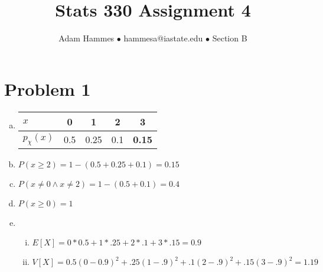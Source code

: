 \documentclass[11pt]{article}
\begin{document}
\title{Stats 330 Assignment 4}
\author{Adam Hammes $\bullet$ hammesa@iastate.edu $\bullet$ Section B}
\maketitle

\section*{Problem 1}
\begin{enumerate}[(a)]
	\item
	\begin{tabular}{l| c c c c|}
		$x$ & 0 & 1 & 2 & 3 \\
		\hline
		$p_{\chi}(x)$ & 0.5 & 0.25 & 0.1 & \textbf{0.15}\\
	\end{tabular}

	\item $P ( x \ge 2) = 1 - (0.5 + 0.25 + 0.1 ) = 0.15$
	
	\item $P ( x \neq 0 \wedge x \neq 2 ) = 1 - (0.5 + 0.1 ) = 0.4$
	
	\item $P ( x \ge 0 ) = 1$
	
	\item
	\begin{enumerate}[i.]
		\item $E[X] = 0 * 0.5 + 1 * .25 + 2 * .1 + 3 * .15 = 0.9$
		
		\item $V[X] = 0.5(0 - 0.9)^2 + .25(1-.9)^2+ .1(2-.9)^2  + .15(3-.9)^2 = 1.19$
	\end{enumerate}
	
	

\end{enumerate}
\end{document}
